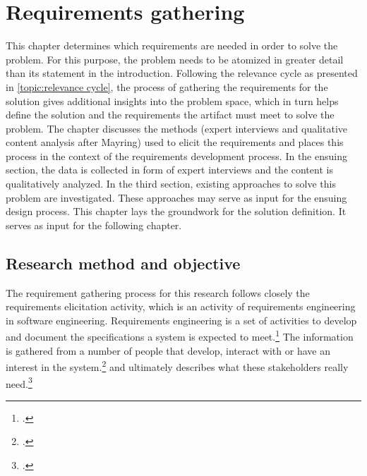 \chapter{Requirements gathering} \label{chap:ReqEng}

This chapter determines which requirements are needed in order to solve the problem. For this purpose, the problem needs to be atomized in greater detail than its statement in the introduction. Following the relevance cycle as presented in \ref{topic:relevance cycle}, the process of gathering the requirements for the solution gives additional insights into the problem space, which in turn helps define the solution and the requirements the artifact must meet to solve the problem. The chapter discusses the methods (expert interviews and qualitative content analysis after Mayring) used to elicit the requirements and places this process in the context of the requirements development process. In the ensuing section, the data is collected in form of expert interviews and the content is qualitatively analyzed. In the third section, existing approaches to solve this problem are investigated. These approaches may serve as input for the ensuing design process. This chapter lays the groundwork for the solution definition. It serves as input for the following chapter. 

\section{Research method and objective}
The requirement gathering process for this research follows closely the requirements elicitation activity, which is an activity of requirements engineering in software engineering. Requirements engineering is a set of activities to develop and document the specifications a system is expected to meet.\footcite[Cf.][p.16]{SommervilleIntegratedrequirementsengineering2005} The information is gathered from a number of people that develop, interact with or have an interest in the system.\footcite[Cf.][p.38]{PatakiSystemRequirementsAnalysis2003} and ultimately describes what these stakeholders really need.\footcite[Cf.][p.1]{GoguenTechniquesrequirementelicitation1993}

